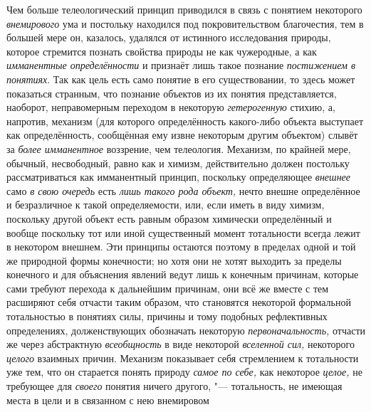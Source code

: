 Чем больше телеологический принцип приводился в связь с
понятием некоторого {\em внемирового}
ума и постольку находился под покровительством благочестия,
тем в большей мере он, казалось, удалялся от истинного исследования
природы, которое стремится познать свойства природы не как чужеродные, а
как {\em имманентные определённости}
и признаёт лишь такое познание
{\em постижением в понятиях}.
Так как цель есть само понятие в его существовании, то здесь
может показаться странным, что познание объектов из их понятия
представляется, наоборот, неправомерным переходом в некоторую
{\em гетерогенную}
стихию, а, напротив, механизм (для которого определённость
какого-либо объекта выступает как определённость, сообщённая ему извне
некоторым другим объектом) слывёт за
{\em более имманентное}
воззрение, чем телеология. Механизм, по крайней мере,
обычный, несвободный, равно как и химизм, действительно должен постольку
рассматриваться как имманентный принцип, поскольку определяющее
{\em внешнее} само
{\em в свою очередь} есть
{\em лишь такого рода объект,}
нечто внешне определённое и безразличное к такой
определяемости, или, если иметь в виду химизм, поскольку другой объект есть
равным образом химически определённый и вообще поскольку тот или иной
существенный момент тотальности всегда лежит в некотором внешнем. Эти
принципы остаются поэтому в пределах одной и той же природной формы
конечности; но хотя они не хотят выходить за пределы
конечного и для объяснения явлений ведут лишь к конечным причинам, которые
сами требуют перехода к дальнейшим причинам, они всё же вместе с тем
расширяют себя отчасти таким образом, что становятся некоторой формальной
тотальностью в понятиях силы, причины и тому подобных рефлективных
определениях, долженствующих обозначать некоторую
{\em первоначальность,}
отчасти же через абстрактную
{\em всеобщность} в виде
некоторой {\em вселенной сил,}
некоторого {\em целого}
взаимных причин. Механизм показывает себя стремлением к
тотальности уже тем, что он старается понять природу
{\em самое по себе,} как
некоторое {\em целое,} не
требующее для {\em своего}
понятия ничего другого, "--- тотальность, не
имеющая места в цели и в связанном с нею внемировом
